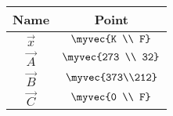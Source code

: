\begin{tabular}[12pt]{ |c| c|}
    \hline
    \textbf{Name} & \textbf{Point}\\ 
    \hline
    $\vec{x}$ & $\myvec{K \\ F}$\\
    \hline
	$\vec{A}$ & $\myvec{273 \\ 32}$\\
    \hline
    $\vec{B}$ & $\myvec{373\\212}$\\
    \hline
    $\vec{C}$ & $\myvec{0 \\ F}$\\
    \hline
\end{tabular}